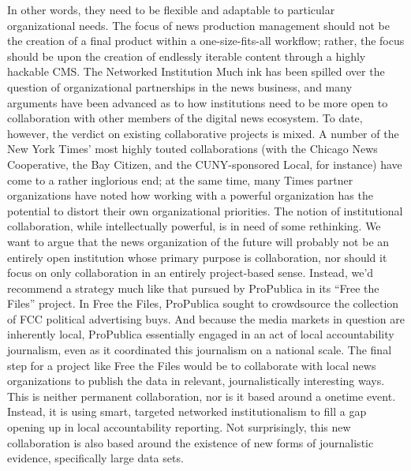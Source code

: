 In other words, they need to be flexible and adaptable to particular organizational
needs. The focus of news production management should not be the
creation of a final product within a one-size-fits-all workflow; rather, the focus
should be upon the creation of endlessly iterable content through a highly
hackable CMS.
The Networked Institution
Much ink has been spilled over the question of organizational partnerships in the
news business, and many arguments have been advanced as to how institutions
need to be more open to collaboration with other members of the digital news
ecosystem. To date, however, the verdict on existing collaborative projects is mixed.
A number of the New York Times’ most highly touted collaborations (with the
Chicago News Cooperative, the Bay Citizen, and the CUNY-sponsored Local,
for instance) have come to a rather inglorious end; at the same time, many Times
partner organizations have noted how working with a powerful organization has
the potential to distort their own organizational priorities. The notion of institutional
collaboration, while intellectually powerful, is in need of some rethinking.
We want to argue that the news organization of the future will probably not be
an entirely open institution whose primary purpose is collaboration, nor should
it focus on only collaboration in an entirely project-based sense. Instead, we’d
recommend a strategy much like that pursued by ProPublica in its ``Free the
Files'' project.
In Free the Files, ProPublica sought to crowdsource the collection of FCC
political advertising buys. And because the media markets in question are
inherently local, ProPublica essentially engaged in an act of local accountability
journalism, even as it coordinated this journalism on a national scale. The
final step for a project like Free the Files would be to collaborate with local
news organizations to publish the data in relevant, journalistically interesting
ways. This is neither permanent collaboration, nor is it based around a onetime
event. Instead, it is using smart, targeted networked institutionalism to fill
a gap opening up in local accountability reporting. Not surprisingly, this new
collaboration is also based around the existence of new forms of journalistic
evidence, specifically large data sets.

